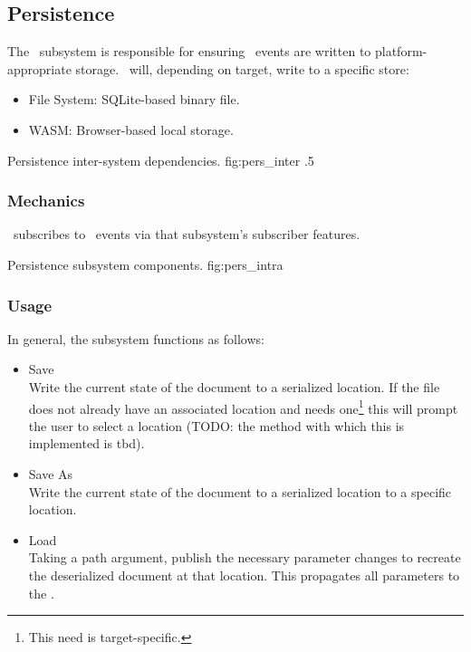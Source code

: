 \subsection{Persistence}
The \permod\ subsystem is responsible for ensuring \docdtype\ events are written to platform-appropriate storage.
\permod\ will, depending on target, write to a specific store:
\begin{itemize}
      \item File System: SQLite-based binary file.
      \item WASM: Browser-based local storage.
\end{itemize}

{Persistence inter-system dependencies.}
{fig:pers_inter}
{.5}


\subsubsection{Mechanics}
\perftype\ subscribes to \docmod\ events via that subsystem's \docftype subscriber features.


{Persistence subsystem components.}
{fig:pers_intra}
{}


\subsubsection{Usage}
In general, the subsystem functions as follows:
\begin{itemize}
      \item Save \\
            Write the current state of the document to a serialized location.
            If the file does not already have an associated location and needs one\footnote{This need is target-specific.} this will prompt the user to select a location (TODO: the method with which this is implemented is tbd).
      \item Save As \\
            Write the current state of the document to a serialized location to a specific location.
      \item Load \\
            Taking a path argument, publish the necessary parameter changes to recreate the deserialized document at that location.
            This propagates all parameters to the \docftype.
\end{itemize}